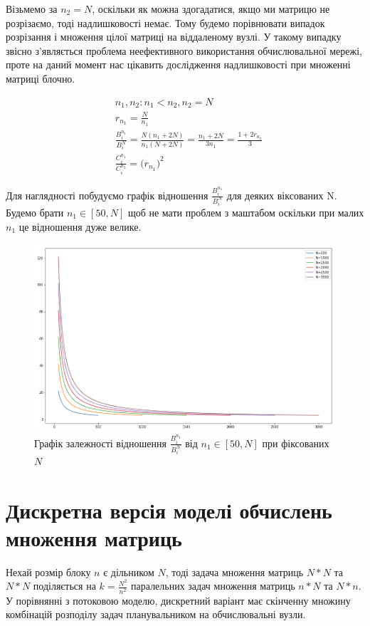 Візьмемо за $n_2=N$, оскільки як можна здогадатися, якщо ми матрицю не розрізаємо, тоді надлишковості немає. Тому будемо порівнювати випадок розрізання і множення цілої матриці на віддаленому вузлі. У такому випадку звісно з'являється проблема неефективного використання обчислювальної мережі, проте на даний момент нас цікавить дослідження надлишковості при множенні матриці блочно.

\begin{equation}
\label{eq:diff_n1n2}
	\begin{aligned}
	& n_1, n_2 : n_1 < n_2, n_2 = N
	\\
	& r_{n_1} = \frac{N}{n_{1}}
	\\
	& \frac{B_i^{n_1}}{B_i^{N}} =\frac{ N ( n_1 + 2N ) }{n_1 ( N + 2N )} = \frac{n_1 + 2N}{3n_1} = \frac{1 + 2r_{n_1}}{3}
	\\
	& \frac{C_i^{n_1}}{C_i^{n_2}} = \bigg( r_{n_1} \bigg)^2
	\end{aligned}
\end{equation}

Для наглядності побудуємо графік відношення $\frac{B_i^{n_1}}{B_i^{N}}$ для деяких віксованих N. Будемо брати $n_1 \in [50, N]$ щоб не мати проблем з маштабом оскільки при малих $n_1$ це відношення дуже велике.

\begin{figure}[H]
	\centering
	\includegraphics[width=\textwidth]{theory/img/B_times_diff_N}
	\caption{Графік залежності відношення $\frac{B_i^{n_1}}{B_i^{N}}$ від $n_1 \in [50, N]$ при фіксованих $N$ }
	\label{fig:one_diff_N}
\end{figure}

\section{Дискретна версія моделі обчислень множення матриць}
Нехай розмір блоку $n$ є дільником $N$, тоді задача множення матриць $N*N$ та $N*N$ поділяється на $k = \frac{N^2}{n^2}$ паралельних задач множення матриць $n*N$ та $N*n$.
У порівнянні з потоковою моделю, дискретний варіант має скінченну множину комбінацій розподілу задач планувальником на обчислювальні вузли.

